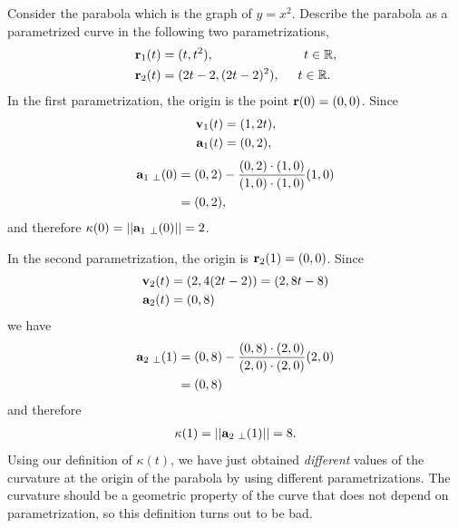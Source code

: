 \documentclass[12pt,letterpaper,reqno]{article}
\numberwithin{equation}{section}
\newcommand{\R}{\ensuremath{\mathbb R}}
\newcommand{\bv}{{\bf v}}
\newcommand{\ba}{{\bf a}}
\newcommand{\bbr}{{\bf r}}
\begin{document}
{\begin{example}\label{ex:curvature_arb_bad_def}
Consider the parabola which is the graph of $y=x^2$. Describe the parabola as a parametrized curve in the following two  parametrizations,	
\begin{align*}
	\bbr_1(t)&=(t,t^2), \hspace{2.5cm} t \in \R, \\
	\bbr_2(t)&=(2t-2,(2t-2)^2), \hspace{0.5cm} t \in \R.
\end{align*}
In the first parametrization, the origin is the point $\bbr(0)=(0,0)$. Since
\begin{align*}
	\bv_1(t)&=(1,2t), \\
	\ba_1(t)&=(0,2),
\end{align*}
\begin{align*}
	\ba_{1 \ \perp}(0)&=(0,2)-\frac{(0,2)\cdot (1,0)}{(1,0)\cdot (1,0)}(1,0) \\
	&=(0,2),
\end{align*}
and therefore $\kappa(0)=||\ba_{1 \ \perp}(0)||=2$.

In the second parametrization, the origin is $\bbr_2(1)=(0,0)$. Since
\begin{align*}
	\bv_2(t)&=(2,4(2t-2))=(2,8t-8) \\
	\ba_2(t)&=(0,8) \\
\end{align*}
we have
\begin{align*}
	\ba_{2 \ \perp}(1)&=(0,8)-\frac{(0,8)\cdot (2,0)}{(2,0) \cdot (2,0)}(2,0) \\
	&=(0,8)
\end{align*}
and therefore
\begin{align*}
	\kappa(1)=||\ba_{2 \ \perp}(1)||=8.
\end{align*}
Using our definition of $\kappa(t)$, we have just obtained \emph{different} values of the curvature at the origin of the parabola by using different parametrizations. The curvature should be a geometric property of the curve that does not depend on parametrization, so this definition turns out to be bad. 
\end{example}

}
\end{document}
